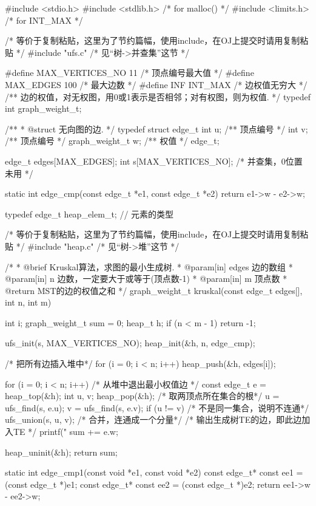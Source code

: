\begin{Codex}[label=mgraph_kruskal.c]
#include <stdio.h>
#include <stdlib.h>  /* for malloc() */
#include <limits.h>  /* for INT_MAX */

/* 等价于复制粘贴，这里为了节约篇幅，使用include，在OJ上提交时请用复制粘贴 */
#include "ufs.c"  /* 见“树->并查集”这节 */

#define MAX_VERTICES_NO 11 /* 顶点编号最大值 */
#define MAX_EDGES 100  /* 最大边数 */
#define INF INT_MAX  /* 边权值无穷大 */
/** 边的权值，对无权图，用0或1表示是否相邻；对有权图，则为权值. */
typedef int graph_weight_t;

/**
 * @struct 无向图的边.
 */
typedef struct edge_t{
    int u;  /** 顶点编号 */
    int v;  /** 顶点编号 */
    graph_weight_t w;  /** 权值 */
} edge_t;

edge_t edges[MAX_EDGES];
int s[MAX_VERTICES_NO]; /* 并查集，0位置未用  */

static int edge_cmp(const edge_t *e1, const edge_t *e2) {
    return e1->w - e2->w;
}

typedef edge_t heap_elem_t; // 元素的类型

/* 等价于复制粘贴，这里为了节约篇幅，使用include，在OJ上提交时请用复制粘贴 */
#include "heap.c"  /* 见“树->堆”这节 */


/*
  * @brief Kruskal算法，求图的最小生成树.
  * @param[in] edges 边的数组
  * @param[in] n 边数，一定要大于或等于(顶点数-1)
  * @param[in] m 顶点数
  * @return MST的边的权值之和
  */
graph_weight_t kruskal(const edge_t edges[], int n, int m) {
    int i;
    graph_weight_t sum = 0;
    heap_t h;
    if (n < m - 1) return -1;

    ufs_init(s, MAX_VERTICES_NO);
    heap_init(&h, n, edge_cmp);

    /* 把所有边插入堆中*/
    for (i = 0; i < n; i++) {
        heap_push(&h, edges[i]);
    }

    for (i = 0; i < n; i++) {
        /* 从堆中退出最小权值边 */
        const edge_t e = heap_top(&h);
        int u, v;
        heap_pop(&h);
        /* 取两顶点所在集合的根*/
        u = ufs_find(s, e.u);
        v = ufs_find(s, e.v);
        if (u != v) { /* 不是同一集合，说明不连通*/
            ufs_union(s, u, v); /* 合并，连通成一个分量*/
            /* 输出生成树TE的边，即此边加入TE */
            printf("%
            sum += e.w;
        }
    }

    heap_uninit(&h);
    return sum;
}

static int edge_cmp1(const void *e1, const void *e2) {
    const edge_t* const ee1 = (const edge_t *)e1;
    const edge_t* const ee2 = (const edge_t *)e2;
    return ee1->w - ee2->w;
}


\end{Codex}
